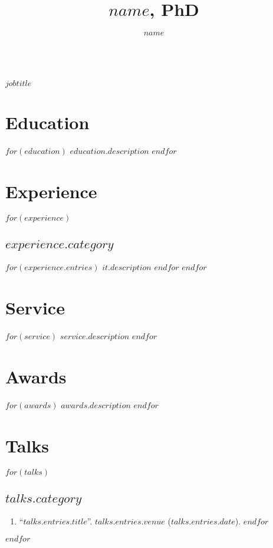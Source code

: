 \documentclass[11pt]{article}
\title{$name$, PhD}
\author{$name$}
\date{}
\makeatletter
\renewcommand\maketitle{
    {\noindent\Large\sffamily\bfseries \@author\\
		\large\normalfont\itshape $jobtitle$}
  }
\makeatother
\begin{document}
%
\thispagestyle{empty}

\maketitle


\section*{Education}
$for(education)$
$education.description$
$endfor$

\section*{Experience}
$for(experience)$
\subsection*{$experience.category$}
$for(experience.entries)$
$it.description$
$endfor$
$endfor$

\section*{Service}
$for(service)$
$service.description$
$endfor$

\section*{Awards}
$for(awards)$
$awards.description$
$endfor$

\section*{Talks}
$for(talks)$
\subsection*{$talks.category$}
\begin{enumerate}
$for(talks.entries)$
\item ``\href{$talks.entires.link$}{$talks.entries.title$}''. $talks.entries.venue$ ($talks.entries.date$).
$endfor$
\end{enumerate}
$endfor$
\end{document}
